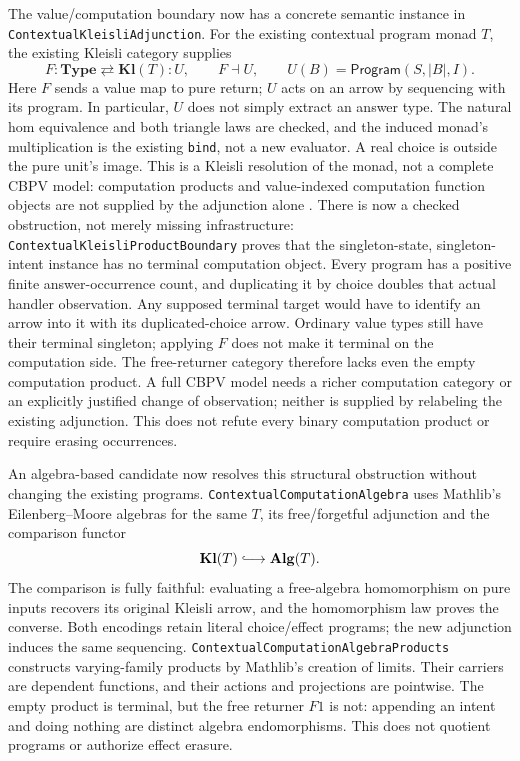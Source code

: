 \documentclass[11pt]{article}
\theoremstyle{definition}
\theoremstyle{remark}
\begin{document}
The value/computation boundary now has a concrete semantic instance in
\nolinkurl{ContextualKleisliAdjunction}. For the existing contextual program
monad $T$, the existing Kleisli category supplies
\[
  F:\mathbf{Type}\rightleftarrows\mathbf{Kl}(T):U,
  \qquad F\dashv U,
  \qquad U(B)=\mathsf{Program}(S,|B|,I).
\]
Here $F$ sends a value map to pure return; $U$ acts on an arrow by sequencing
with its program. In particular, $U$ does not simply extract an answer type.
The natural hom equivalence and both triangle laws are checked, and the
induced monad's multiplication is the existing \texttt{bind}, not a new
evaluator. A real choice is outside the pure unit's image. This is a Kleisli
resolution of the monad, not a complete CBPV model: computation products and
value-indexed computation function objects are not supplied by the adjunction
alone \cite{LevyAdjunctionSemantics}.
There is now a checked obstruction, not merely missing infrastructure:
\nolinkurl{ContextualKleisliProductBoundary} proves that the singleton-state,
singleton-intent instance has no terminal computation object. Every program
has a positive finite answer-occurrence count, and duplicating it by choice
doubles that actual handler observation. Any supposed terminal target would
have to identify an arrow into it with its duplicated-choice arrow. Ordinary
value types still have their terminal singleton; applying $F$ does not make
it terminal on the computation side. The free-returner category therefore
lacks even the empty computation product. A full CBPV model needs a richer
computation category or an explicitly justified change of observation;
neither is supplied by relabeling the existing adjunction. This does not
refute every binary computation product or require erasing occurrences.

An algebra-based candidate now resolves this structural obstruction without
changing the existing programs. \nolinkurl{ContextualComputationAlgebra}
uses Mathlib's Eilenberg--Moore algebras for the same $T$, its free/forgetful
adjunction and the comparison functor
\[
  \mathbf{Kl}(T)\lhook\joinrel\longrightarrow\mathbf{Alg}(T).
\]
The comparison is fully faithful: evaluating a free-algebra homomorphism on
pure inputs recovers its original Kleisli arrow, and the homomorphism law
proves the converse. Both encodings retain literal choice/effect programs;
the new adjunction induces the same sequencing.
\nolinkurl{ContextualComputationAlgebraProducts} constructs varying-family
products by Mathlib's creation of limits. Their carriers are dependent
functions, and their actions and projections are pointwise. The empty product
is terminal, but the free returner $F1$ is not: appending an intent and doing
nothing are distinct algebra endomorphisms. This does not quotient programs
or authorize effect erasure.
\end{document}
